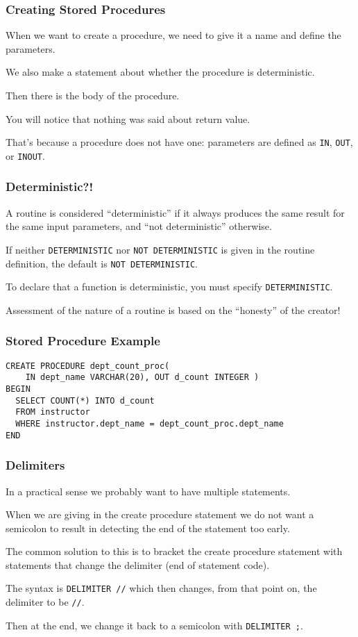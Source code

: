 \begin{frame}
\frametitle{Creating Stored Procedures}

When we want to create a procedure, we need to give it a name and define the parameters.

We also make a statement about whether the procedure is deterministic. 

Then there is the body of the procedure.

You will notice that nothing was said about return value. 

That's because a procedure does not have one: parameters are defined as \texttt{IN}, \texttt{OUT}, or \texttt{INOUT}.

\end{frame}


\begin{frame}
\frametitle{Deterministic?!}

A routine is considered ``deterministic'' if it always produces the same result for the same input parameters, and ``not deterministic'' otherwise. 

If neither \texttt{DETERMINISTIC} nor \texttt{NOT DETERMINISTIC} is given in the routine definition, the default is \texttt{NOT DETERMINISTIC}. 

To declare that a function is deterministic, you must specify \texttt{DETERMINISTIC}.

Assessment of the nature of a routine is based on the ``honesty'' of the creator!

\end{frame}


\begin{frame}[fragile]
\frametitle{Stored Procedure Example}

{\small
\begin{verbatim}
CREATE PROCEDURE dept_count_proc( 
    IN dept_name VARCHAR(20), OUT d_count INTEGER )
BEGIN
  SELECT COUNT(*) INTO d_count
  FROM instructor
  WHERE instructor.dept_name = dept_count_proc.dept_name
END
\end{verbatim}
}

\end{frame}

\begin{frame}
\frametitle{Delimiters}

In a practical sense we probably want to have multiple statements. 

When we are giving in the create procedure statement we do not want a semicolon to result in detecting the end of the statement too early.

The common solution to this is to bracket the create procedure statement with statements that change the delimiter (end of statement code). 

The syntax is \texttt{DELIMITER //} which then changes, from that point on, the delimiter to be \texttt{//}. 
 
Then at the end, we change it back to a semicolon with \texttt{DELIMITER ;}.


\end{frame}

